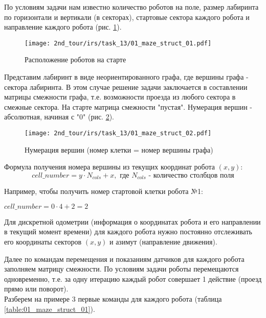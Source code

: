 \solutionSection

По условиям задачи нам известно количество роботов на поле, размер лабиринта по горизонтали и вертикали (в секторах), стартовые сектора каждого робота и направление каждого робота (рис. \ref{fig:01_maze_struct_01}).

\begin{figure}[h!]
	\centering
	\texttt{[image: 2nd\_tour/irs/task\_13/01\_maze\_struct\_01.pdf]}
	\caption{Расположение роботов на старте}
	\label{fig:01_maze_struct_01}
\end{figure}

Представим лабиринт в виде неориентированного графа, где вершины графа - сектора лабиринта. В этом случае решение задачи заключается в составлении матрицы смежности графа, т.е. возможности проезда из любого сектора в смежные сектора. На старте матрица смежности "пустая". Нумерация вершин - абсолютная, начиная с "$0$" (рис. \ref{fig:01_maze_struct_02}).

\begin{figure}[h!]
	\centering
	\texttt{[image: 2nd\_tour/irs/task\_13/01\_maze\_struct\_02.pdf]}
	\caption{Нумерация вершин (номер клетки = номер вершины графа)}
	\label{fig:01_maze_struct_02}
\end{figure}

Формула получения номера вершины из текущих координат робота $(x, y)$:
\begin{equation*}
cell\_number = y \cdot N_{cols} + x, \text{ где } N_{cols} \text{ - количество столбцов поля}
\end{equation*}

Например, чтобы получить номер стартовой клетки робота №1:
\begin{center}
	$cell\_number = 0 \cdot 4 + 2 = 2$
\end{center}

Для дискретной одометрии (информация о координатах робота и его направлении в текущий момент времени) для каждого робота нужно постоянно отслеживать его координаты секторов $(x, y)$ и азимут (направление движения).

Далее по командам перемещения и показаниям датчиков для каждого робота заполняем матрицу смежности. По условиям задачи роботы перемещаются одновременно, т.е. за одну итерацию каждый робот совершает 1 действие (проезд прямо или поворот). 
\\

Разберем на примере 3 первые команды для каждого робота (таблица \ref{table:01_maze_struct_01}).
\\

